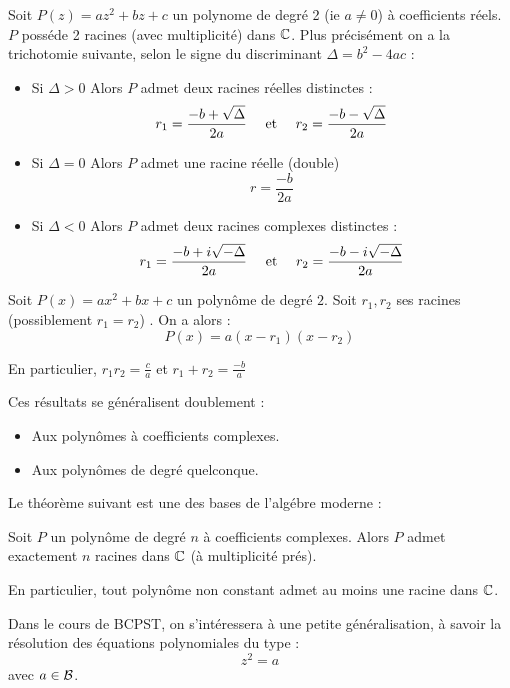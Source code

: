 \documentclass[a4paper, 11pt]{article}
\begin{document}
\begin{theorem}
Soit $P(z)=az^2+bz+c$ un polynome de degré 2 (ie $a\neq 0$) à coefficients réels. $P$ posséde 2 racines (avec multiplicité) dans $\mathbb{C}$. Plus précisément on a la trichotomie suivante, selon le signe du discriminant  $\Delta =b^2-4ac$ :
\begin{itemize}
\item Si \underline{$\Delta >0$} Alors $P$ admet deux racines réelles distinctes : $$r_1 = \frac{-b +\sqrt{\Delta}}{2a}\quad \text{ et } \quad r_2 = \frac{-b -\sqrt{\Delta}}{2a} $$
\item Si \underline{$\Delta =0$} Alors $P$ admet une racine réelle (double)  $$r= \frac{-b }{2a}$$

\item Si \underline{$\Delta <0$} Alors $P$ admet deux racines complexes distinctes : $$r_1 = \frac{-b +i\sqrt{-\Delta}}{2a}\quad \text{ et } \quad r_2 = \frac{-b -i\sqrt{-\Delta}}{2a} $$
\end{itemize}


\end{theorem}

\begin{theorem}
Soit $P(x)=ax^2+bx+c$ un polynôme  de degré $2$. Soit $r_1, r_2$ ses racines (possiblement $r_1=r_2$) . On a alors : 
$$P(x) = a(x-r_1)(x-r_2)$$

En particulier, $r_1r_2= \frac{c}{a}$ et $r_1+r_2=\frac{-b}{a}$

\end{theorem}

Ces résultats se généralisent doublement : 
\begin{itemize}
\item Aux polynômes à coefficients complexes.
\item Aux polynômes  de degré quelconque. 
\end{itemize}

Le théorème suivant est une des bases de l'algébre moderne : 
\begin{theorem}
Soit $P$ un polynôme de degré $n$ à coefficients complexes. Alors $P$ admet exactement $n$ racines dans $\mathbb{C}$ (à multiplicité prés). 

En particulier, tout polynôme non constant admet au moins une racine dans $\mathbb{C}$.
\end{theorem}


Dans le cours de BCPST, on s'intéressera à une petite généralisation, à savoir la résolution des équations polynomiales du type : 
$$z^2=a$$
avec $a\in \mathcal{B}$. 
\end{document}
